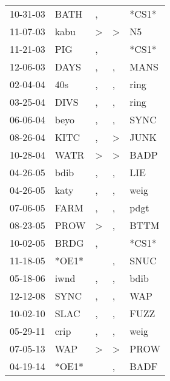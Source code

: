 \begin{supertabular}{lllll}
 10-31-03 &   BATH &             , &               &  *CS1* \\
 11-07-03 &   kabu &  \textgreater &  \textgreater &     N5 \\
 11-21-03 &    PIG &             , &               &  *CS1* \\
 12-06-03 &   DAYS &             , &             , &   MANS \\
 02-04-04 &    40s &             , &             , &   ring \\
 03-25-04 &   DIVS &             , &             , &   ring \\
 06-06-04 &   beyo &             , &             , &   SYNC \\
 08-26-04 &   KITC &             , &  \textgreater &   JUNK \\
 10-28-04 &   WATR &  \textgreater &  \textgreater &   BADP \\
 04-26-05 &   bdib &             , &             , &    LIE \\
 04-26-05 &   katy &             , &             , &   weig \\
 07-06-05 &   FARM &             , &             , &   pdgt \\
 08-23-05 &   PROW &  \textgreater &             , &   BTTM \\
 10-02-05 &   BRDG &             , &               &  *CS1* \\
 11-18-05 &  *OE1* &               &             , &   SNUC \\
 05-18-06 &   iwnd &             , &             , &   bdib \\
 12-12-08 &   SYNC &             , &             , &    WAP \\
 10-02-10 &   SLAC &             , &             , &   FUZZ \\
 05-29-11 &   crip &             , &             , &   weig \\
 07-05-13 &    WAP &  \textgreater &  \textgreater &   PROW \\
 04-19-14 &  *OE1* &               &             , &   BADF \\
\end{supertabular}
